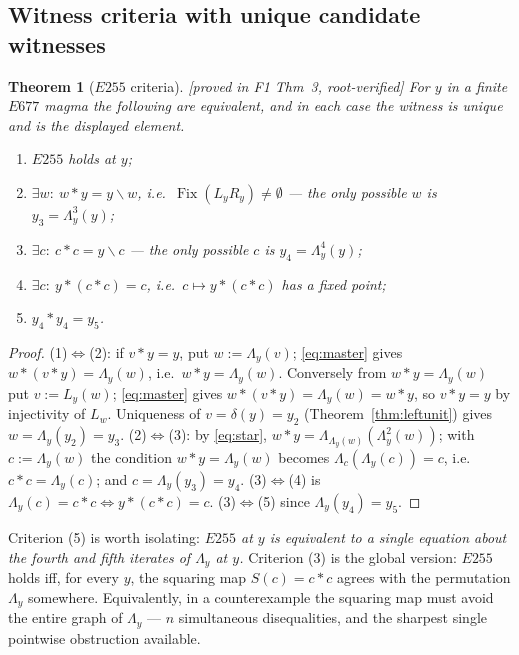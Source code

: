 \documentclass[11pt]{article}
\theoremstyle{plain}
\newtheorem{theorem}{Theorem}[section]
\theoremstyle{definition}
\theoremstyle{remark}
\numberwithin{equation}{section}
\newcommand{\op}{\mathbin{*}}
\newcommand{\Fix}{\operatorname{Fix}}
\newcommand{\statusbox}[1]{{\small\sloppy\textsf{[#1]}}}
\newcommand{\PROVED}[1]{\statusbox{proved in #1, root-verified}}
\begin{document}
\subsection{Witness criteria with unique candidate witnesses}

\begin{theorem}[$E255$ criteria]\label{thm:E255criteria}
\PROVED{F1 Thm~3}
For $y$ in a finite $E677$ magma the following are equivalent, and in each case the witness
is \emph{unique} and is the displayed element.
\begin{enumerate}
\item $E255$ holds at $y$;
\item $\exists w:\ w \op y = y\backslash w$, i.e.\ $\Fix(L_yR_y)\ne\emptyset$ --- the only
possible $w$ is $y_3 = \Lambda_y^3(y)$;
\item $\exists c:\ c\op c = y\backslash c$ --- the only possible $c$ is
$y_4 = \Lambda_y^4(y)$;
\item $\exists c:\ y\op(c\op c) = c$, i.e.\ $c\mapsto y\op(c\op c)$ has a fixed point;
\item $y_4 \op y_4 = y_5$.
\end{enumerate}
\end{theorem}

\begin{proof}
(1)$\Leftrightarrow$(2): if $v\op y = y$, put $w := \Lambda_y(v)$; \eqref{eq:master} gives
$w\op(v\op y) = \Lambda_y(w)$, i.e.\ $w\op y = \Lambda_y(w)$. Conversely from
$w\op y = \Lambda_y(w)$ put $v := L_y(w)$; \eqref{eq:master} gives
$w\op(v\op y) = \Lambda_y(w) = w\op y$, so $v\op y = y$ by injectivity of $L_w$. Uniqueness
of $v = \delta(y) = y_2$ (Theorem~\ref{thm:leftunit}) gives $w = \Lambda_y(y_2) = y_3$.
(2)$\Leftrightarrow$(3): by \eqref{eq:star}, $w\op y = \Lambda_{\Lambda_y(w)}(\Lambda_y^2(w))$;
with $c := \Lambda_y(w)$ the condition $w\op y = \Lambda_y(w)$ becomes
$\Lambda_c(\Lambda_y(c)) = c$, i.e.\ $c\op c = \Lambda_y(c)$; and
$c = \Lambda_y(y_3) = y_4$. (3)$\Leftrightarrow$(4) is
$\Lambda_y(c) = c\op c \iff y\op(c\op c) = c$. (3)$\Leftrightarrow$(5) since
$\Lambda_y(y_4) = y_5$.
\end{proof}

Criterion (5) is worth isolating: \emph{$E255$ at $y$ is equivalent to a single equation
about the fourth and fifth iterates of $\Lambda_y$ at $y$.} Criterion (3) is the global
version: $E255$ holds iff, for every $y$, the squaring map $S(c) = c\op c$ agrees with the
permutation $\Lambda_y$ somewhere. Equivalently, in a counterexample the squaring map must
avoid the entire graph of $\Lambda_y$ --- $n$ simultaneous disequalities, and the sharpest
single pointwise obstruction available.
\end{document}
